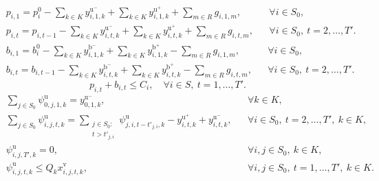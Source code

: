 \begin{subequations}\label{eq:usable-inventory}
\begin{align}
&p_{i,1}
=p_i^0-\sum_{k\in K}y_{i,1,k}^{\mathrm{u}^{-}}
+\sum_{k\in K}y_{i,1,k}^{\mathrm{u}^{+}}
+\sum_{m\in R}g_{i,1,m},
&&\forall i\in S_0, \label{eq:usable-inventory-first}\\
&p_{i,t}
=p_{i,t-1}-\sum_{k\in K}y_{i,t,k}^{\mathrm{u}^{-}}
+\sum_{k\in K}y_{i,t,k}^{\mathrm{u}^{+}}
+\sum_{m\in R}g_{i,t,m},
&&\forall i\in S_0,\ t=2,\ldots,T'. \label{eq:usable-inventory-recursive}
\end{align}
\end{subequations}
\begin{subequations}\label{eq:broken-inventory}
\begin{align}
&b_{i,1}
=b_i^0-\sum_{k\in K}y_{i,1,k}^{\mathrm{b}^{-}}
+\sum_{k\in K}y_{i,1,k}^{\mathrm{b}^{+}}
-\sum_{m\in R}g_{i,1,m},
&&\forall i\in S_0, \label{eq:broken-inventory-first}\\
&b_{i,t}
=b_{i,t-1}-\sum_{k\in K}y_{i,t,k}^{\mathrm{b}^{-}}
+\sum_{k\in K}y_{i,t,k}^{\mathrm{b}^{+}}
-\sum_{m\in R}g_{i,t,m},
&&\forall i\in S_0,\ t=2,\ldots,T'. \label{eq:broken-inventory-recursive}
\end{align}
\end{subequations}
\begin{equation}
p_{i,t}+b_{i,t}\le C_i,
\quad \forall i\in S,\ t=1,\ldots,T'.
\label{eq:station-capacity}
\end{equation}
\begin{subequations}\label{eq:usable-load}
\begin{align}
&\sum_{j\in S_0}\psi_{0,j,1,k}^{\mathrm{u}}
=y_{0,1,k}^{\mathrm{u}^{-}},
&&\forall k\in K, \label{eq:usable-load-initial}\\
&\sum_{j\in S_0}\psi_{i,j,t,k}^{\mathrm{u}}
=\sum_{\substack{j\in S_0:\\ t>t'_{j,i}}}
\psi_{j,i,t-t'_{j,i},k}^{\mathrm{u}}
-y_{i,t,k}^{\mathrm{u}^{+}}
+y_{i,t,k}^{\mathrm{u}^{-}},
&&\forall i\in S_0,\ t=2,\ldots,T',\ k\in K, \label{eq:usable-load-balance}\\
&\psi_{i,j,T',k}^{\mathrm{u}}
=0,
&&\forall i,j\in S_0,\ k\in K, \label{eq:usable-load-final}\\
&\psi_{i,j,t,k}^{\mathrm{u}}
\le Q_k x_{i,j,t,k}^{\mathrm{v}},
&&\forall i,j\in S_0,\ t=1,\ldots,T',\ k\in K. \label{eq:usable-load-link}
\end{align}
\end{subequations}
